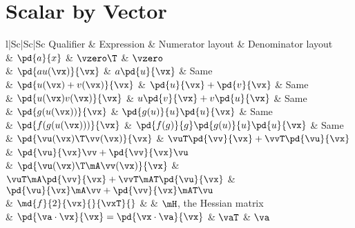 \section{Scalar by Vector}
\begin{center}
\begin{tabular}{l|Sc|Sc|Sc}
Qualifier                  & Expression                                    & Numerator layout                                   & Denominator layout                            \\
                           & $\pd{a}{x}$                                   & $\vzero\T$                                         & $\vzero$                                      \\
                           & $\pd{au(\vx)}{\vx}$                           & $a\pd{u}{\vx}$                                     & Same                                          \\
                           & $\pd{u(\vx)+v(\vx)}{\vx}$                     & $\pd{u}{\vx} + \pd{v}{\vx}$                        & Same                                          \\
                           & $\pd{u(\vx)v(\vx)}{\vx}$                      & $u\pd{v}{\vx} + v\pd{u}{\vx}$                      & Same                                          \\
                           & $\pd{g(u(\vx))}{\vx}$                         & $\pd{g(u)}{u}\pd{u}{\vx}$                          & Same                                          \\
                           & $\pd{f(g(u(\vx)))}{\vx}$                      & $\pd{f(g)}{g}\pd{g(u)}{u}\pd{u}{\vx}$              & Same                                          \\
                           & $\pd{\vu(\vx)\T\vv(\vx)}{\vx}$                & $\vuT\pd{\vv}{\vx}+\vvT\pd{\vu}{\vx}$              & $\pd{\vu}{\vx}\vv+\pd{\vv}{\vx}\vu$           \\
                           & $\pd{\vu(\vx)\T\mA\vv(\vx)}{\vx}$             & $\vuT\mA\pd{\vv}{\vx}+\vvT\mAT\pd{\vu}{\vx}$       & $\pd{\vu}{\vx}\mA\vv+\pd{\vv}{\vx}\mAT\vu$    \\
                           & $\md{f}{2}{\vx}{}{{\vxT}}{}$                  &                                                    & $\mH$, the Hessian matrix                     \\
                           & $\pd{\va\cdot\vx}{\vx}=\pd{\vx\cdot\va}{\vx}$ & $\vaT$                                             & $\va$                                         \\

\end{tabular}
\end{center}
